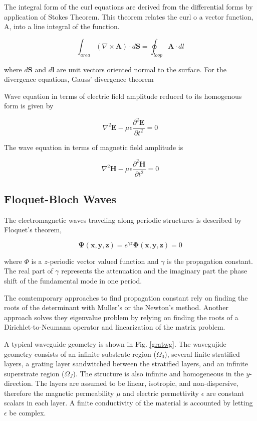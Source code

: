 The integral form of the curl equations are derived from the
differential forms by application of Stokes Theorem. This
theorem relates the curl o a vector function, A, into a line
integral of the function.

\begin{equation}
\int_{area} ( \nabla \times \mathbf{A} ) \cdot d \mathbf{S} = 
\oint_{loop} \mathbf{A} \cdot dl
\end{equation}

where $d \mathbf{S}$ and $d\mathbf{l}$ are unit vectors oriented normal
to the surface. For the divergence equations, Gauss' divergence theorem

Wave equation in terms of electric field amplitude reduced to its
homogenous form is given by

\begin{equation}
\nabla^2 \mathbf{E} - \mu \epsilon \frac{\partial^2 
  \mathbf{E}}{\partial t^2} = 0
\end{equation}

The wave equation in terms of magnetic field amplitude is 

\begin{equation}
\nabla^2 \mathbf{H} - \mu \epsilon \frac{\partial^2 
  \mathbf{H}}{\partial t^2} = 0
\end{equation}

\subsection{Floquet-Bloch Waves} The electromagnetic waves traveling
along periodic structures is described by Floquet's theorem,

\begin{equation}
\mathbf{\Psi(x,y,z)} = e^{\gamma z} \mathbf{\Phi(x,y,z)} = 0
\label{defD0}
\end{equation}

where $\Phi$ is a $z$-periodic vector valued function and $\gamma$
is the propagation constant. The real part of $\gamma$ represents the
attenuation and the imaginary part the phase shift of the fundamental
mode in one period.

The comtemporary approaches to find propagation constant rely on
finding the roots of the determinant with Muller's or the Newton's
method. Another approach solves they eigenvalue problem by relying on
finding the roots of a Dirichlet-to-Neumann operator and linearization
of the matrix problem.

A typical waveguide geometry is shown in Fig. \ref{gratwg}. The
wavegujide geometry consists of an infinite substrate region
($\Omega_0$), several finite stratified layers, a grating layer
sandwitched between the stratified layers, and an infinite superstrate
region ($\Omega_J$). The structure is also infinite and homogeneous in
the $y$-direction. The layers are assumed to be linear, isotropic, and
non-dispersive, therefore the magnetic permeability $\mu$ and electric
permettivity $\epsilon$ are constant scalars in each layer. A finite
conductivity of the material is accounted by letting $\epsilon$ be
complex.

